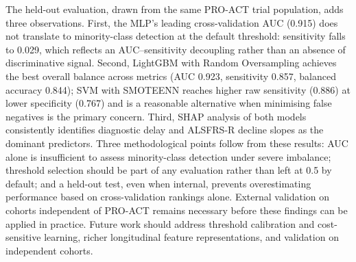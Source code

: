\documentclass[a4paper,twoside]{article}
\begin{document}
The held-out evaluation, drawn from the same PRO-ACT trial population, adds
three observations. First, the MLP's leading cross-validation AUC (0.915) does
not translate to minority-class detection at the default threshold: sensitivity
falls to 0.029, which reflects an AUC--sensitivity decoupling rather than an
absence of discriminative signal. Second, LightGBM with Random Oversampling
achieves the best overall balance across metrics (AUC 0.923, sensitivity 0.857,
balanced accuracy 0.844); SVM with SMOTEENN reaches higher raw sensitivity
(0.886) at lower specificity (0.767) and is a reasonable alternative when
minimising false negatives is the primary concern. Third, SHAP analysis of both
models consistently identifies diagnostic delay and ALSFRS-R decline slopes as
the dominant predictors.
Three methodological points follow from these results: AUC alone is insufficient
to assess minority-class detection under severe imbalance; threshold selection
should be part of any evaluation rather than left at 0.5 by default; and a
held-out test, even when internal, prevents overestimating performance based on
cross-validation rankings alone. External validation on cohorts independent of
PRO-ACT remains necessary before these findings can be applied in practice.
Future work should address threshold calibration and cost-sensitive learning,
richer longitudinal feature representations, and validation on independent
cohorts.



{\small
}
\end{document}
